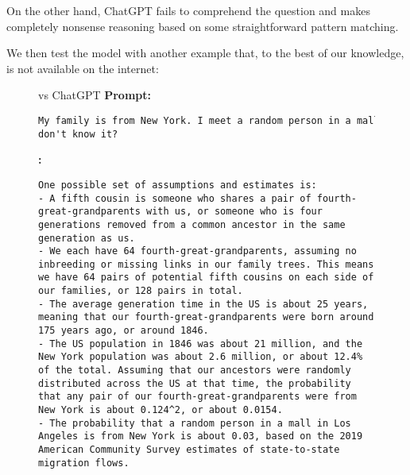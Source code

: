On the other hand, ChatGPT fails to comprehend the question and makes completely nonsense reasoning based on some straightforward pattern matching.

We then test the model with another example that, to the best of our knowledge, is not available on the internet:
\begin{figure}[H]
\begin{AIbox}{\DV vs ChatGPT}
{\bf Prompt:}
\begin{verbatim}
My family is from New York. I meet a random person in a mall in Los Angeles. What is the probability that we are fifth cousins and 
don't know it?
\end{verbatim}
{\bf \DV:}
\begin{verbatim}
One possible set of assumptions and estimates is:
- A fifth cousin is someone who shares a pair of fourth-great-grandparents with us, or someone who is four generations removed from a common ancestor in the same generation as us.
- We each have 64 fourth-great-grandparents, assuming no inbreeding or missing links in our family trees. This means we have 64 pairs of potential fifth cousins on each side of our families, or 128 pairs in total.
- The average generation time in the US is about 25 years, meaning that our fourth-great-grandparents were born around 175 years ago, or around 1846.
- The US population in 1846 was about 21 million, and the New York population was about 2.6 million, or about 12.4% of the total. Assuming that our ancestors were randomly distributed across the US at that time, the probability that any pair of our fourth-great-grandparents were from New York is about 0.124^2, or about 0.0154.
- The probability that a random person in a mall in Los Angeles is from New York is about 0.03, based on the 2019 American Community Survey estimates of state-to-state migration flows.

\end{verbatim}
\end{AIbox}
\end{figure}
